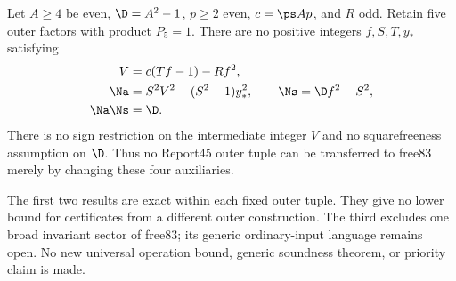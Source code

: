 \begin{theorem}
\label{thm:free}
Let $A\ge4$ be even, $\D=A^2-1$, $p\ge2$ even,
$c=\ps A p$, and $R$ odd. Retain five outer factors with product
$P_5=1$. There are no positive integers $f,S,T,y_*$ satisfying
\begin{align}
 V&=c(Tf-1)-Rf^2,\label{eq:freeV}\\
 \Na&=S^2V^2-(S^2-1)y_*^2,\qquad
 \Ns=\D f^2-S^2,\label{eq:freenorms}\\
 \Na\Ns&=\D.\label{eq:freeproduct}
\end{align}
There is no sign restriction on the intermediate integer $V$ and no
squarefreeness assumption on $\D$. Thus no Report45 outer tuple can
be transferred to free83 merely by changing these four auxiliaries.
\end{theorem}

The first two results are exact within each fixed outer tuple. They
give no lower bound for certificates from a different outer construction.
The third excludes one broad invariant sector of free83; its generic
ordinary-input language remains open. No new universal operation bound,
generic soundness theorem, or priority claim is made.

